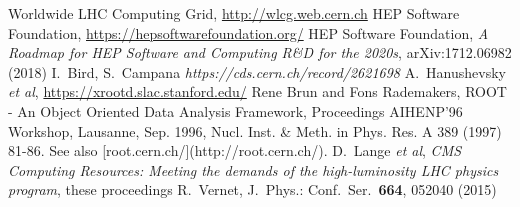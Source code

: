\begin{thebibliography}{}
Worldwide LHC Computing Grid, \url{http://wlcg.web.cern.ch}
HEP Software Foundation, \url{https://hepsoftwarefoundation.org/}
HEP Software Foundation, \textit{A Roadmap for HEP Software and Computing R\&D for the 2020s}, arXiv:1712.06982 (2018)
I.~Bird, S.~Campana \textit{https://cds.cern.ch/record/2621698}
A.~Hanushevsky {\em et al}, \url{https://xrootd.slac.stanford.edu/}
Rene Brun and Fons Rademakers, ROOT - An Object Oriented Data Analysis Framework,
Proceedings AIHENP'96 Workshop, Lausanne, Sep. 1996, Nucl. Inst. \& Meth. in Phys. Res. A 389 (1997) 81-86. See also [root.cern.ch/](http://root.cern.ch/).
D.~Lange {\em et al}, \textit{CMS Computing Resources: Meeting the demands of the high-luminosity LHC physics program}, these proceedings
R.~Vernet, J.\ Phys.: Conf.\ Ser.\ \textbf{664}, 052040 (2015)
\end{thebibliography}
